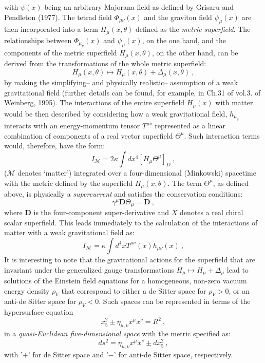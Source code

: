 \documentclass[12pt]{article}
\theoremstyle{plain}
\theoremstyle{definition}
\numberwithin{equation}{section}
\newcommand{\<}{{\langle}}
\begin{document}
with $\psi(x)$ being an arbitrary Majorana field as defined by
Grisaru and Pendleton (1977). The tetrad field $\Phi _{\mu
\nu}(x)$ and the graviton field $\psi _\mu(x)$ are then
incorporated into a term $H_\mu (x,\theta)$ defined as the
\emph{metric superfield}. The relationships between $\Phi _{\mu _
\nu}(x)$ and $\psi _\mu(x)$, on the one hand, and the components
of the metric superfield $H_\mu (x,\theta)$, on the other hand,
can be derived from the transformations of the whole metric
superfield:
\begin{equation}
H_\mu (x,\theta)\longmapsto H_\mu (x,\theta)+ \Delta _\mu
(x,\theta)~,
\end{equation}
by making the simplifying-- and physically realistic-- assumption
of a weak gravitational field (further details can be found, for
example, in Ch.31 of vol.3. of Weinberg, 1995). The interactions
of the entire superfield $H_\mu (x)$ with matter would be then
described by considering how a weak gravitational field,
$h_{\mu_\nu}$ interacts with an energy-momentum tensor $T^{\mu
\nu}$ represented as a linear combination of components of a real
vector superfield $\Theta^\mu$.  Such interaction terms would,
therefore, have the form:
\begin{equation}
 I_{\mathcal M}= 2\kappa \int dx^4 [H_\mu \Theta^\mu]_D ~,
\end{equation}
($\mathcal M$ denotes `matter') integrated over a four-dimensional
(Minkowski) spacetime with the metric defined by the superfield
$H_\mu (x,\theta)$. The term $\Theta^\mu$, as defined above, is
physically a \emph{supercurrent} and satisfies the conservation
conditions:
\begin{equation}
\gamma^\mu \mathbf{D} \Theta _\mu = \mathbf{D} ~,
\end{equation}
where $\mathbf{D}$ is the four-component super-derivative and $X$
denotes a real chiral scalar superfield. This leads immediately to
the calculation of the interactions of matter with a weak
gravitational field as:
\begin{equation}
I_{\mathcal M} = \kappa \int d^4 x T^{\mu \nu}(x)h_{\mu \nu}(x) ~,
\end{equation}
It is interesting to note that the gravitational actions for the
superfield that are invariant under the generalized gauge
transformations $H_\mu \longmapsto H _\mu  + \Delta _\mu$ lead to
solutions of the Einstein field equations for a homogeneous,
non-zero vacuum energy density $\rho _V$ that correspond to either
a de Sitter space for $\rho _V>0$, or an anti-de Sitter space for
$\rho _V <0$. Such spaces can be represented in terms of the
hypersurface equation
\begin{equation}
x^2_5 \pm \eta _{\mu,\nu} x^\mu x^\nu = R^2 ~,
\end{equation}
in a {\em quasi-Euclidean five-dimensional space} with the metric
specified as:
\begin{equation}
ds^2 = \eta _{\mu,\nu} x^\mu x^\nu \pm dx^2_5 ~,
\end{equation}
with '$+$' for de Sitter space and '$-$' for anti-de Sitter space,
respectively.
\end{document}
